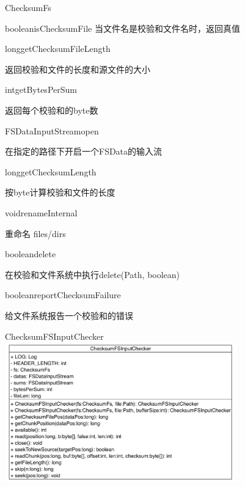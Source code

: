 \begin{XeClass}{ChecksumFs}
\begin{XeMethod}{\XePublic}{boolean}{isChecksumFile}
 当文件名是校验和文件名时，返回真值

    \end{XeMethod}

    \begin{XeMethod}{\XePublic}{long}{getChecksumFileLength}
         
 返回校验和文件的长度和源文件的大小

    \end{XeMethod}

    \begin{XeMethod}{\XePublic}{int}{getBytesPerSum}
         
 返回每个校验和的byte数

    \end{XeMethod}

    \begin{XeMethod}{\XePublic}{FSDataInputStream}{open}
         
 在指定的路径下开启一个FSData的输入流

    \end{XeMethod}

    \begin{XeMethod}{\XePublic}{long}{getChecksumLength}
         
 按byte计算校验和文件的长度

    \end{XeMethod}

    \begin{XeMethod}{\XePublic}{void}{renameInternal}
         
 重命名 files/dirs

    \end{XeMethod}

    \begin{XeMethod}{\XePublic}{boolean}{delete}
         
 在校验和文件系统中执行delete(Path, boolean)

    \end{XeMethod}

    \begin{XeMethod}{\XePublic}{boolean}{reportChecksumFailure}
         
 给文件系统报告一个校验和的错误

    \end{XeMethod}

    \begin{XeInnerClass}{ChecksumFSInputChecker}
\includegraphics[width=10cm]{cdig/ChecksumFSInputChecker.png}
         

\end{XeInnerClass}
\end{XeClass}
